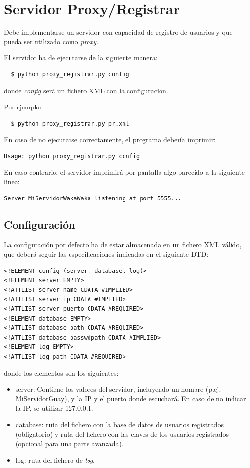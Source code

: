 \documentclass[a4paper,11pt]{article}
\begin{document}
\section{Servidor Proxy/Registrar}


Debe implementarse un servidor con capacidad de registro de usuarios y que pueda ser utilizado como \emph{proxy}.

El servidor ha de ejecutarse de la siguiente manera:
\begin{verbatim}
  $ python proxy_registrar.py config
\end{verbatim}

donde \emph{config} será un fichero XML con la configuración.

Por ejemplo:
\begin{verbatim}
  $ python proxy_registrar.py pr.xml
\end{verbatim}

En caso de no ejecutarse correctamente, el programa debería imprimir:
\begin{verbatim}
Usage: python proxy_registrar.py config
\end{verbatim}

En caso contrario, el servidor imprimirá por pantalla algo parecido a la siguiente línea:
\begin{verbatim}
Server MiServidorWakaWaka listening at port 5555...
\end{verbatim}


\subsection{Configuración}

  La configuración por defecto ha de estar almacenada en un fichero XML válido, que deberá seguir las especificaciones indicadas en el siguiente DTD:

\begin{verbatim}
<!ELEMENT config (server, database, log)>
<!ELEMENT server EMPTY>
<!ATTLIST server name CDATA #IMPLIED>
<!ATTLIST server ip CDATA #IMPLIED>
<!ATTLIST server puerto CDATA #REQUIRED>
<!ELEMENT database EMPTY>
<!ATTLIST database path CDATA #REQUIRED>
<!ATTLIST database passwdpath CDATA #IMPLIED>
<!ELEMENT log EMPTY>
<!ATTLIST log path CDATA #REQUIRED>
\end{verbatim}

donde los elementos son los siguientes:

\begin{itemize}
  \item server: Contiene los valores del servidor, incluyendo un nombre (p.ej. MiServidorGuay), y la IP y el puerto donde escuchará. En caso de no indicar la IP, se utilizar 127.0.0.1.
  \item database: ruta del fichero con la base de datos de usuarios registrados (obligatorio) y ruta del fichero con las claves de los usuarios registrados (opcional para una parte avanzada).
  \item log: ruta del fichero de \emph{log}.
\end{itemize}
\end{document}
